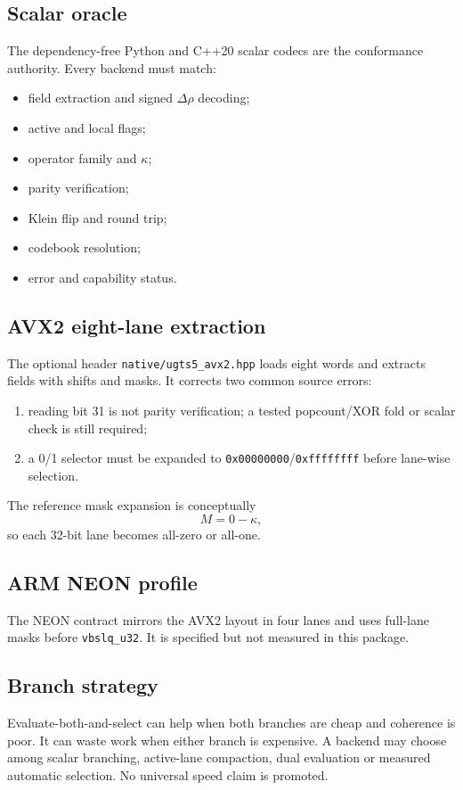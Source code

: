 \documentclass[11pt,a4paper]{article}
\begin{document}
\subsection{Scalar oracle}
The dependency-free Python and C++20 scalar codecs are the conformance authority. Every backend must match:
\begin{itemize}
\item field extraction and signed \(\Delta\rho\) decoding;
\item active and local flags;
\item operator family and \(\kappa\);
\item parity verification;
\item Klein flip and round trip;
\item codebook resolution;
\item error and capability status.
\end{itemize}

\subsection{AVX2 eight-lane extraction}
The optional header \texttt{native/ugts5\_avx2.hpp} loads eight words and extracts fields with shifts and masks. It corrects two common source errors:
\begin{enumerate}
\item reading bit 31 is not parity verification; a tested popcount/XOR fold or scalar check is still required;
\item a 0/1 selector must be expanded to \texttt{0x00000000}/\texttt{0xffffffff} before lane-wise selection.
\end{enumerate}

The reference mask expansion is conceptually
\[
M=0-\kappa,
\]
so each 32-bit lane becomes all-zero or all-one.

\subsection{ARM NEON profile}
The NEON contract mirrors the AVX2 layout in four lanes and uses full-lane masks before \texttt{vbslq\_u32}. It is specified but not measured in this package.

\subsection{Branch strategy}
Evaluate-both-and-select can help when both branches are cheap and coherence is poor. It can waste work when either branch is expensive. A backend may choose among scalar branching, active-lane compaction, dual evaluation or measured automatic selection. No universal speed claim is promoted.
\end{document}
